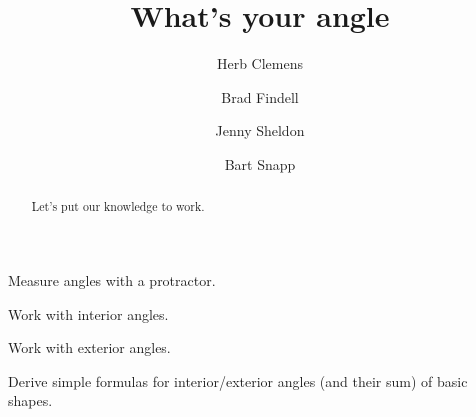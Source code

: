 \documentclass[nooutcomes,noauthor,hints,handout,12pt]{ximera}
\title{What's your angle}
\author{Herb Clemens \and Brad Findell \and Jenny Sheldon \and Bart Snapp}
\begin{document}
\begin{abstract}
  Let's put our knowledge to work. 
\end{abstract}
\maketitle


\begin{listOutcomes}
\item Measure angles with a protractor.
\item Work with interior angles.
\item Work with exterior angles.
\item Derive simple formulas for interior/exterior angles (and their
  sum) of basic shapes.
\end{listOutcomes}

\mynewpage



 
       
\end{document}

